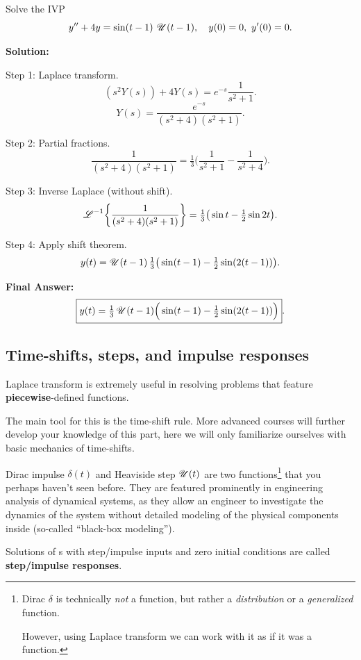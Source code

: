   \begin{example}
    Solve the IVP
    \[
    y'' + 4y = \sin(t-1)\,\operatorname{\mathscr{U}}(t-1), \quad y(0)=0,\ y'(0)=0.
    \]

    \textbf{Solution:}  

    Step 1: Laplace transform.
    \[
    (s^2Y(s)) + 4Y(s) = e^{-s}\frac{1}{s^2+1}.
    \]
    \[
    Y(s) = \frac{e^{-s}}{(s^2+4)(s^2+1)}.
    \]

    Step 2: Partial fractions.
    \[
    \frac{1}{(s^2+4)(s^2+1)} = \tfrac{1}{3}\Big(\frac{1}{s^2+1} - \frac{1}{s^2+4}\Big).
    \]

    Step 3: Inverse Laplace (without shift).
    \[
    \operatorname{\mathscr{L}}^{-1}\!\left\{\frac{1}{(s^2+4)(s^2+1)}\right\}
    = \tfrac{1}{3}\big(\sin t - \tfrac{1}{2}\sin 2t\big).
    \]

    Step 4: Apply shift theorem.
    \[
    y(t) = \operatorname{\mathscr{U}}(t-1)\,\tfrac{1}{3}\big(\sin(t-1) - \tfrac{1}{2}\sin(2(t-1))\big).
    \]

    \textbf{Final Answer:}
    \[
    \boxed{y(t) = \tfrac{1}{3}\operatorname{\mathscr{U}}(t-1)\Big(\sin(t-1) - \tfrac{1}{2}\sin(2(t-1))\Big)}.
    \]
  \end{example}



    \subsection*{Time-shifts, steps, and impulse responses}

    \begin{weekintro}
      Laplace transform is extremely useful in resolving problems that feature \textbf{piecewise}-defined functions.

      The main tool for this is the time-shift rule. More advanced courses will further develop your knowledge of this part, here we will only
      familiarize ourselves with basic mechanics of time-shifts.

      Dirac impulse \(\delta(t)\) and Heaviside step  \(\operatorname{\mathscr{U}}(t)\) are two 
      functions\footnote{Dirac \(\delta\) is technically \emph{not} a function, but rather a \emph{distribution} or a \emph{generalized} function. 

      However, using Laplace transform we can work with it as if it was a function.} that you perhaps haven't seen before.
      They are featured prominently in engineering analysis of dynamical systems, as they allow an engineer to investigate the dynamics of the system without detailed modeling of the physical components inside (so-called ``black-box modeling'').
      
      Solutions of \ode{}s with step/impulse inputs and zero initial conditions are called \textbf{step/impulse responses}.
    \end{weekintro}



